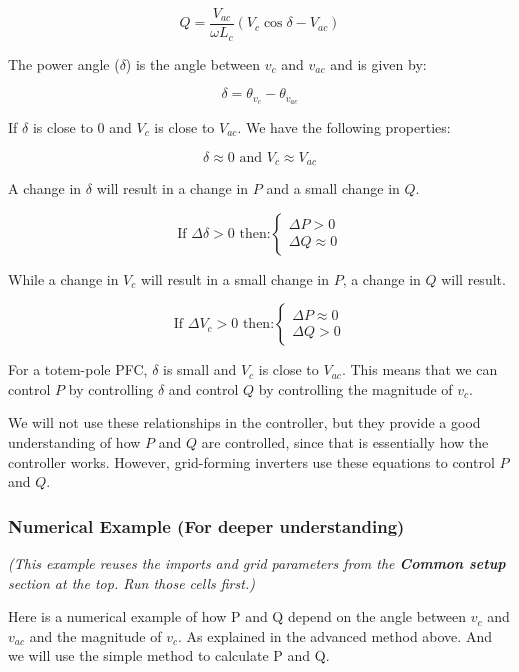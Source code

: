 \documentclass[11pt]{article}
\begin{document}
\[
    Q = \frac{V_{ac}}{\omega L_c} ( V_c \cos \delta - V_{ac} )
\]

The power angle (\(\delta\)) is the angle between \(v_{c}\) and
\(v_{ac}\) and is given by:

\[
    \delta = \theta_{v_c} - \theta_{v_{ac}}
\]

If \(\delta\) is close to 0 and \(V_c\) is close to \(V_{ac}\). We have
the following properties:

\[
    \delta \approx 0 \text{ and } V_c \approx V_{ac}
\]

A change in \(\delta\) will result in a change in \(P\) and a small
change in \(Q\).

\[
    \text{If } \Delta \delta > 0 \text{ then:}
    \begin{cases}
    \Delta P > 0 \\
    \Delta Q \approx 0
    \end{cases}
\]

While a change in \(V_{c}\) will result in a small change in \(P\), a
change in \(Q\) will result.

\[
    \text{If } \Delta V_{c} > 0 \text{ then:}
    \begin{cases}
    \Delta P \approx 0 \\
    \Delta Q > 0
    \end{cases}
\]

For a totem-pole PFC, \(\delta\) is small and \(V_c\) is close to \(V_{ac}\).
This means that we can control \(P\) by controlling \(\delta\) and
control \(Q\) by controlling the magnitude of \(v_{c}\).

We will not use these relationships in the controller, but they provide
a good understanding of how \(P\) and \(Q\) are controlled, since that
is essentially how the controller works. However, grid-forming inverters
use these equations to control \(P\) and \(Q\).

    \hypertarget{numerical-example-for-deeper-understanding}{%
\subsubsection{Numerical Example (For deeper
understanding)}\label{numerical-example-for-deeper-understanding}}

    \emph{(This example reuses the imports and grid parameters from the
\textbf{Common setup} section at the top. Run those cells first.)}

    Here is a numerical example of how P and Q depend on the angle between
\(v_{c}\) and \(v_{ac}\) and the magnitude of \(v_{c}\). As explained in
the advanced method above. And we will use the simple method to
calculate P and Q.
\end{document}

